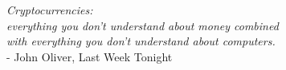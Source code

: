 
\begin{dedication} 
    \begin{flushright}
        \emph{Cryptocurrencies:} \\
        \emph{everything you don't understand about money combined} \\
        \emph{with everything you don't understand about computers.} \\
        - John Oliver, Last Week Tonight
    \end{flushright}
\end{dedication}

